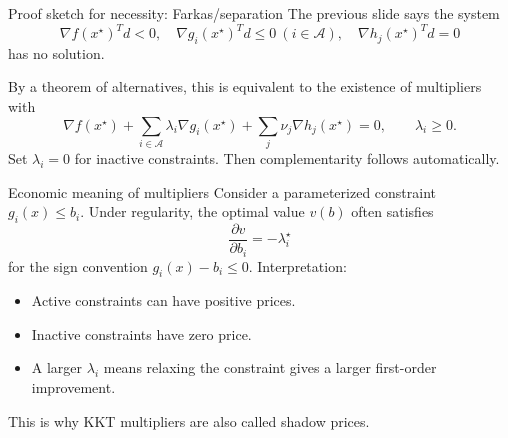 \documentclass[aspectratio=169]{beamer}
\newcommand{\act}{\mathcal{A}}
\begin{document}
\begin{frame}{Proof sketch for necessity: Farkas/separation}
  The previous slide says the system
  \[
    \nabla f(x^\star)^Td<0,\quad
    \nabla g_i(x^\star)^Td\le 0\ (i\in\act),\quad
    \nabla h_j(x^\star)^Td=0
  \]
  has no solution.
  \vspace{.3em}

  By a theorem of alternatives, this is equivalent to the existence of multipliers with
  \[
    \nabla f(x^\star)+\sum_{i\in\act}\lambda_i\nabla g_i(x^\star)+\sum_j\nu_j\nabla h_j(x^\star)=0,
    \qquad \lambda_i\ge 0.
  \]
  Set $\lambda_i=0$ for inactive constraints. Then complementarity follows automatically.
  \vspace{.5em}

  \begin{center}
  \end{center}
\end{frame}

\begin{frame}{Economic meaning of multipliers}
  Consider a parameterized constraint $g_i(x)\le b_i$.
  Under regularity, the optimal value $v(b)$ often satisfies
  \[
    \frac{\partial v}{\partial b_i}=-\lambda_i^\star
  \]
  for the sign convention $g_i(x)-b_i\le 0$.
  \vspace{.5em}
  Interpretation:
  \begin{itemize}
    \item Active constraints can have positive prices.
    \item Inactive constraints have zero price.
    \item A larger $\lambda_i$ means relaxing the constraint gives a larger first-order improvement.
  \end{itemize}
  \vspace{.3em}
  This is why KKT multipliers are also called shadow prices.
\end{frame}
\end{document}
